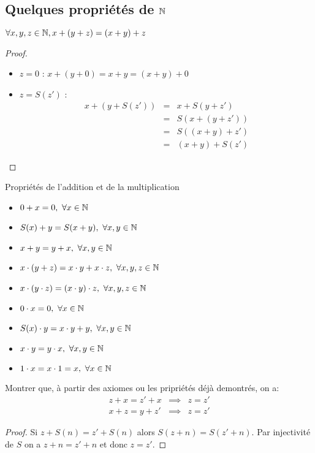 \subsection{Quelques propriétés de $\mathbb{N}$}


\begin{prop}
	$\forall x, y, z \in \mathbb{N}, x + (y + z) = (x + y) + z$
\end{prop}

\begin{proof}
	\begin{itemize}
		\item $z = 0$ : $x + (y + 0) = x + y = (x + y) + 0$
		\item $z = S(z')$ :
		      \begin{eqnarray*}
			      x + (y + S(z')) & = & x + S(y + z') \\
			      & = & S(x + (y + z')) \\
			      & = & S((x + y) + z') \\
			      & = & (x + y) + S(z')
		      \end{eqnarray*}
	\end{itemize}
\end{proof}

\begin{prop} Propriétés de l'addition et de la multiplication
	\begin{itemize}
		\item $ 0 + x = 0, \ \forall x \in \mathbb{N}$
		\item $S(x) + y = S(x + y), \ \forall x, y \in \mathbb{N}$
		\item $x + y = y + x, \ \forall x, y \in \mathbb{N}$
		\item $x \cdot (y + z) = x \cdot y + x \cdot z, \ \forall x, y, z \in \mathbb{N}$
		\item $x \cdot ( y \cdot z) = (x \cdot y) \cdot z, \ \forall x, y, z \in \mathbb{N}$
		\item $ 0 \cdot x = 0, \ \forall x \in \mathbb{N}$
		\item $S(x) \cdot y = x \cdot y + y, \ \forall x, y \in \N$
		\item $x \cdot y = y \cdot x, \ \forall x, y \in \mathbb{N}$
		\item $1 \cdot x =  x \cdot 1 =  x, \ \forall x \in \mathbb{N}$
	\end{itemize}
\end{prop}


\begin{example}
	Montrer que, à partir des axiomes ou les pripriétés déjà demontrés, on a:
	\begin{eqnarray*}
		z + x  = z' + x &\implies& z = z' \\
		x + z  = y + z' &\implies& z = z'
	\end{eqnarray*}
\end{example}

\begin{proof}
	Si $z + S(n) = z' + S(n)$ alors $S(z + n) = S(z' + n)$.
	Par injectivité de $S$ on a $z + n = z' + n$ et donc $z = z'$.
\end{proof}
